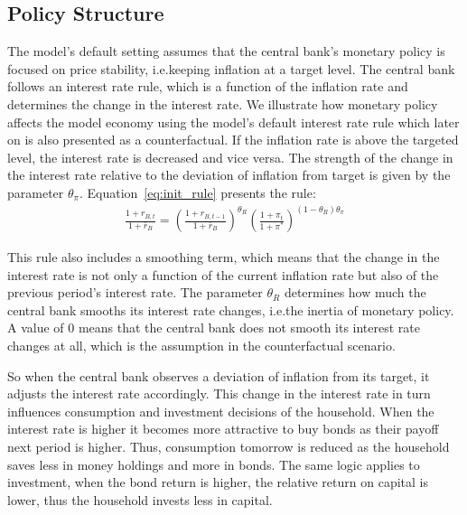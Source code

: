 \documentclass[12pt]{article}
\begin{document}
\subsection*{Policy Structure}
The model's default setting assumes that the central bank's monetary policy is focused on price stability, i.e.\@ keeping inflation at a target level. The central bank follows an interest rate rule, which is a function of the inflation rate and determines the change in the interest rate. We illustrate how monetary policy affects the model economy using the model's default interest rate rule which later on is also presented as a counterfactual. If the inflation rate is above the targeted level, the interest rate is decreased and vice versa. The strength of the change in the interest rate relative to the deviation of inflation from target is given by the parameter $\theta_{\pi}$. 
Equation~\ref{eq:init_rule} presents the rule:
\begin{align}\label{eq:init_rule}
    \frac{1 + r_{B,t}}{1 + \bar{r}_B} = \left( \frac{1 + r_{B,t-1}}{1 + \bar{r}_B} \right)^{\theta_R} \left( \frac{1 + \pi_t}{1 + \pi^*} \right)^{(1 - \theta_R)\theta_{\pi}}
\end{align}

This rule also includes a smoothing term, which means that the change in the interest rate is not only a function of the current inflation rate but also of the previous period's interest rate. The parameter $\theta_R$ determines how much the central bank smooths its interest rate changes, i.e.\@ the inertia of monetary policy. A value of 0 means that the central bank does not smooth its interest rate changes at all, which is the assumption in the counterfactual scenario. 

So when the central bank observes a deviation of inflation from its target, it adjusts the interest rate accordingly. This change in the interest rate in turn influences consumption and investment decisions of the household. When the interest rate is higher it becomes more attractive to buy bonds as their payoff next period is higher. Thus, consumption tomorrow is reduced as the household saves less in money holdings and more in bonds. The same logic applies to investment, when the bond return is higher, the relative return on capital is lower, thus the household invests less in capital.
\end{document}
